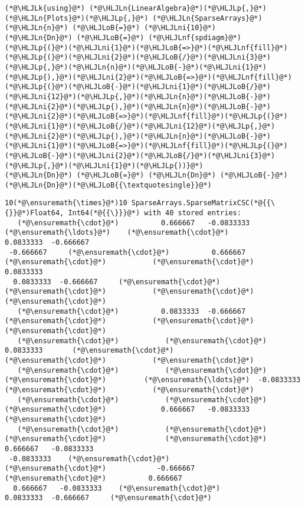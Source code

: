 \documentclass[12pt,a4paper]{article}
\newcommand{\HLJLk}[1]{\textcolor[RGB]{148,91,176}{\textbf{#1}}}
\newcommand{\HLJLn}[1]{#1}
\newcommand{\HLJLnf}[1]{\textcolor[RGB]{66,102,213}{#1}}
\newcommand{\HLJLni}[1]{\textcolor[RGB]{59,151,46}{#1}}
\newcommand{\HLJLoB}[1]{\textcolor[RGB]{102,102,102}{\textbf{#1}}}
\newcommand{\HLJLp}[1]{#1}
\begin{document}
\begin{lstlisting}
(*@\HLJLk{using}@*) (*@\HLJLn{LinearAlgebra}@*)(*@\HLJLp{,}@*) (*@\HLJLn{Plots}@*)(*@\HLJLp{,}@*) (*@\HLJLn{SparseArrays}@*)
(*@\HLJLn{n}@*) (*@\HLJLoB{=}@*) (*@\HLJLni{10}@*)
(*@\HLJLn{Dn}@*) (*@\HLJLoB{=}@*) (*@\HLJLnf{spdiagm}@*)(*@\HLJLp{(}@*)(*@\HLJLni{1}@*)(*@\HLJLoB{=>}@*)(*@\HLJLnf{fill}@*)(*@\HLJLp{(}@*)(*@\HLJLni{2}@*)(*@\HLJLoB{/}@*)(*@\HLJLni{3}@*)(*@\HLJLp{,}@*)(*@\HLJLn{n}@*)(*@\HLJLoB{-}@*)(*@\HLJLni{1}@*)(*@\HLJLp{),}@*)(*@\HLJLni{2}@*)(*@\HLJLoB{=>}@*)(*@\HLJLnf{fill}@*)(*@\HLJLp{(}@*)(*@\HLJLoB{-}@*)(*@\HLJLni{1}@*)(*@\HLJLoB{/}@*)(*@\HLJLni{12}@*)(*@\HLJLp{,}@*)(*@\HLJLn{n}@*)(*@\HLJLoB{-}@*)(*@\HLJLni{2}@*)(*@\HLJLp{),}@*)(*@\HLJLn{n}@*)(*@\HLJLoB{-}@*)(*@\HLJLni{2}@*)(*@\HLJLoB{=>}@*)(*@\HLJLnf{fill}@*)(*@\HLJLp{(}@*)(*@\HLJLni{1}@*)(*@\HLJLoB{/}@*)(*@\HLJLni{12}@*)(*@\HLJLp{,}@*)(*@\HLJLni{2}@*)(*@\HLJLp{),}@*)(*@\HLJLn{n}@*)(*@\HLJLoB{-}@*)(*@\HLJLni{1}@*)(*@\HLJLoB{=>}@*)(*@\HLJLnf{fill}@*)(*@\HLJLp{(}@*)(*@\HLJLoB{-}@*)(*@\HLJLni{2}@*)(*@\HLJLoB{/}@*)(*@\HLJLni{3}@*)(*@\HLJLp{,}@*)(*@\HLJLni{1}@*)(*@\HLJLp{))}@*)
(*@\HLJLn{Dn}@*) (*@\HLJLoB{=}@*) (*@\HLJLn{Dn}@*) (*@\HLJLoB{-}@*) (*@\HLJLn{Dn}@*)(*@\HLJLoB{{\textquotesingle}}@*)
\end{lstlisting}

\begin{lstlisting}
10(*@\ensuremath{\times}@*)10 SparseArrays.SparseMatrixCSC(*@{{\{}}@*)Float64, Int64(*@{{\}}}@*) with 40 stored entries:
   (*@\ensuremath{\cdot}@*)          0.666667   -0.0833333  (*@\ensuremath{\ldots}@*)    (*@\ensuremath{\cdot}@*)          0.0833333  -0.666667
 -0.666667     (*@\ensuremath{\cdot}@*)          0.666667        (*@\ensuremath{\cdot}@*)           (*@\ensuremath{\cdot}@*)          0.0833333
  0.0833333  -0.666667     (*@\ensuremath{\cdot}@*)              (*@\ensuremath{\cdot}@*)           (*@\ensuremath{\cdot}@*)           (*@\ensuremath{\cdot}@*) 
   (*@\ensuremath{\cdot}@*)          0.0833333  -0.666667        (*@\ensuremath{\cdot}@*)           (*@\ensuremath{\cdot}@*)           (*@\ensuremath{\cdot}@*) 
   (*@\ensuremath{\cdot}@*)           (*@\ensuremath{\cdot}@*)          0.0833333       (*@\ensuremath{\cdot}@*)           (*@\ensuremath{\cdot}@*)           (*@\ensuremath{\cdot}@*) 
   (*@\ensuremath{\cdot}@*)           (*@\ensuremath{\cdot}@*)           (*@\ensuremath{\cdot}@*)         (*@\ensuremath{\ldots}@*)  -0.0833333    (*@\ensuremath{\cdot}@*)           (*@\ensuremath{\cdot}@*) 
   (*@\ensuremath{\cdot}@*)           (*@\ensuremath{\cdot}@*)           (*@\ensuremath{\cdot}@*)             0.666667   -0.0833333    (*@\ensuremath{\cdot}@*) 
   (*@\ensuremath{\cdot}@*)           (*@\ensuremath{\cdot}@*)           (*@\ensuremath{\cdot}@*)              (*@\ensuremath{\cdot}@*)          0.666667   -0.0833333
 -0.0833333    (*@\ensuremath{\cdot}@*)           (*@\ensuremath{\cdot}@*)            -0.666667     (*@\ensuremath{\cdot}@*)          0.666667
  0.666667   -0.0833333    (*@\ensuremath{\cdot}@*)             0.0833333  -0.666667     (*@\ensuremath{\cdot}@*)
\end{lstlisting}
\end{document}
